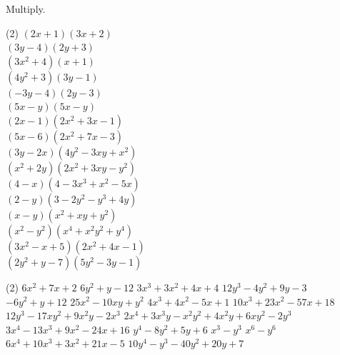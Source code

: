 \documentclass[12pt,fleqn]{book}
\newcommand{\prb}[1]{\begin{Exercise}#1\end{Exercise}}
\newcommand{\sol}[1]{\begin{Answer}#1\end{Answer}}
\begin{document}
\prb {Multiply.
    \begin{tasks}(2)
\task $(2 x+1)(3 x+2)$
		\\[5em]
\task $(3 y-4)(2 y+3)$
		\\[5em]
\task $\left(3 x^2+4\right)(x+1)$
		\\[5em]
\task $\left(4 y^2+3\right)(3 y-1)$
		\\[5em]
\task $(-3 y-4)(2 y-3)$
		\\[5em]
\task $(5 x-y)(5 x-y)$
		\\[5em]
\task $(2 x-1)\left(2 x^2+3 x-1\right)$
		\\[5em]
\task $(5 x-6)\left(2 x^2+7 x-3\right)$
		\\[5em]
\task $(3 y-2 x)\left(4 y^2-3 x y+x^2\right)$
		\\[5em]
\task $\left(x^2+2 y\right)\left(2 x^2+3 x y-y^2\right)$
		\\[5em]
\task $(4-x)\left(4-3 x^3+x^2-5 x\right)$
		\\[5em]
\task $(2-y)\left(3-2 y^2-y^3+4 y\right)$
		\\[5em]
\task $(x-y)\left(x^2+x y+y^2\right)$
		\\[5em]
\task $\left(x^2-y^2\right)\left(x^4+x^2 y^2+y^4\right)$
		\\[5em]
\task $\left(3 x^2-x+5\right)\left(2 x^2+4 x-1\right)$
		\\[5em]
\task $\left(2 y^2+y-7\right)\left(5 y^2-3 y-1\right)$
		\\[5em]
\end{tasks}
}
\sol{
    \begin{tasks}(2)
\task $6 x^2+7 x+2$
\task $6 y^2+y-12$
\task $3 x^3+3 x^2+4 x+4$
\task $12 y^3-4 y^2+9 y-3$
\task $-6 y^2+y+12$
\task $25 x^2-10 x y+y^2$
\task $4 x^3+4 x^2-5 x+1$
\task $10 x^3+23 x^2-57 x+18$
\task $12 y^3-17 x y^2+9 x^2 y-2 x^3$
\task $2 x^4+3 x^3 y-x^2 y^2+4 x^2 y+6 x y^2-2 y^3$
\task $3 x^4-13 x^3+9 x^2-24 x+16$
\task $y^4-8 y^2+5 y+6$
\task $x^3-y^3$
\task $x^6-y^6$
\task $6 x^4+10 x^3+3 x^2+21 x-5$
\task $10 y^4-y^3-40 y^2+20 y+7$
\end{tasks}
}
\end{document}
